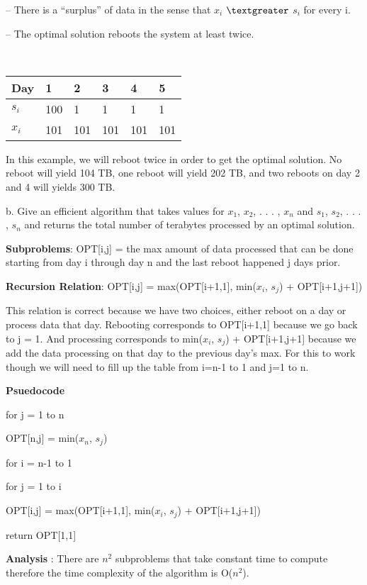 \documentclass{article}
\begin{document}
\indent \indent – There is a “surplus” of data in the sense that $x_{i}$
$\textgreater$ $s_{i}$ for every i.

\indent \indent – The optimal solution reboots the system at least twice. \newline

{\centering\ \begin{tabu} to 0.8\textwidth { |X[c]|X[c]|X[c]|X[c]|X[c]| X[c]|}
 \hline
 Day & 1 & 2 & 3 & 4 & 5\\
 \hline
 $s_{i}$  & 100 & 1 & 1 & 1 & 1 \\
\hline
 $x_{i}$  & 101 & 101 & 101 & 101 & 101 \\
\hline
\end{tabu} \newline  \par}

In this example, we will reboot twice in order to get the optimal solution.
No reboot will yield 104 TB, one reboot will yield 202 TB, and two
reboots on day 2 and 4 will yields 300 TB. \newline

\indent \indent b. Give an efficient algorithm that takes values for
$x_{1}$, $x_{2}$, . . . , $x_{n}$ and $s_{1}$, $s_{2}$, . . . , $s_{n}$ and
returns the total number of terabytes processed by an optimal solution.

\textbf{Subproblems}: OPT[i,j] = the max amount of data processed that can be done starting
from day i through day n and the last reboot happened j days prior.

\textbf{Recursion Relation}: OPT[i,j] = max(OPT[i+1,1], min($x_i$, $s_j$) + OPT[i+1,j+1])

This relation is correct because we have two choices, either reboot on a day or
process data that day.  Rebooting corresponds to OPT[i+1,1] because we go back
to j = 1.  And processing corresponds to min($x_i$, $s_j$) + OPT[i+1,j+1]
because we add the data processing on that day to the previous day's max.
For this to work though we will need
to fill up the table from i=n-1 to 1 and j=1 to n.

\textbf{Psuedocode}

for j = 1 to n

\indent \indent OPT[n,j] = min($x_n$, $s_j$)

for i = n-1 to 1

\indent \indent for j = 1 to i

\indent \indent \indent \indent OPT[i,j] = max(OPT[i+1,1], min($x_i$, $s_j$) + OPT[i+1,j+1])

return OPT[1,1]

\textbf{Analysis} : There are $n^2$ subproblems that take constant time to compute
therefore the time complexity of the algorithm is O($n^2$).
\end{document}
